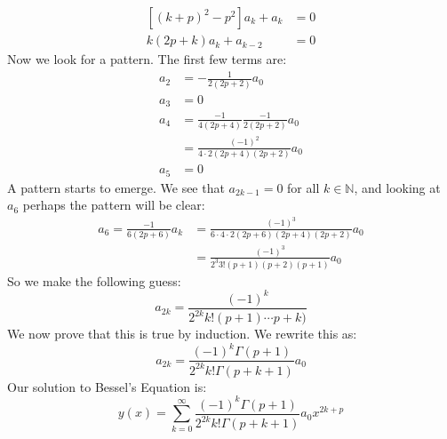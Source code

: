         \begin{subequations}
            \begin{align}
                [(k+p)^{2}-p^{2}]a_{k}+a_{k}&=0\\
                k(2p+k)a_{k}+a_{k-2}&=0
            \end{align}
        \end{subequations}
        Now we look for a pattern. The first few terms are:
        \begin{subequations}
            \begin{align}
                a_{2}&=\minus\frac{1}{2(2p+2)}a_{0}\\
                a_{3}&=0\\
                a_{4}&=\frac{\minus{1}}{4(2p+4)}
                    \frac{\minus{1}}{2(2p+2)}a_{0}\\
                &=\frac{(\minus{1})^{2}}{4\cdot{2}(2p+4)(2p+2)}a_{0}\\
                a_{5}&=0
            \end{align}
        \end{subequations}
        A pattern starts to emerge. We see that $a_{2k-1}=0$ for
        all $k\in\mathbb{N}$, and looking at $a_{6}$ perhaps the
        pattern will be clear:
        \begin{subequations}
            \begin{align}
                a_{6}=\frac{\minus{1}}{6(2p+6)}a_{k}&=
                \frac{(\minus{1})^{3}}
                    {6\cdot{4}\cdot{2}(2p+6)(2p+4)(2p+2)}a_{0}\\
                &=\frac{(\minus{1})^{3}}{2^{3}3!(p+1)(p+2)(p+1)}a_{0}
            \end{align}
        \end{subequations}
        So we make the following guess:
        \begin{equation}
            a_{2k}=\frac{(\minus{1})^{k}}{2^{2k}k!(p+1)\cdots{p+k)}}
        \end{equation}
        We now prove that this is true by induction.
        We rewrite this as:
        \begin{equation}
            a_{2k}=
            \frac{(\minus{1})^{k}\Gamma(p+1)}
                {2^{2k}k!\Gamma(p+k+1)}a_{0}
        \end{equation}
        Our solution to Bessel's Equation is:
        \begin{equation}
            y(x)=\sum_{k=0}^{\infty}
                \frac{(\minus{1})^{k}\Gamma(p+1)}
                    {2^{2k}k!\Gamma(p+k+1)}a_{0}x^{2k+p}
        \end{equation}

